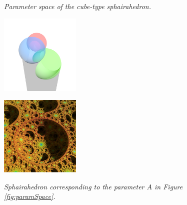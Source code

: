 \begin{figure}[htbp]
\begin{minipage}[t]{0.24\textwidth}
\begin{tikzpicture}[line cap=round,line join=round,>=triangle
 45,x=1cm,y=1cm]
\end{tikzpicture}
  \caption{\textit{Parameter space of the cube-type sphairahedron.}}
  \label{fig:paramSpace}
 \end{minipage}
 \hspace*{\fill}
 \begin{minipage}[t]{0.5\textwidth}
  \begin{minipage}[t]{0.24\textwidth}
   \centering
   \includegraphics[width=1.5in, height=1.5in, keepaspectratio]{./img/application/sphairahedron/derivation/prism-0864.png}
   \label{fig:pointASphaira}
  \end{minipage}
  \hspace*{\fill}
  \begin{minipage}[t]{0.24\textwidth}
   \centering
   \includegraphics[width=1.5in, height=1.5in, keepaspectratio]{./img/application/sphairahedron/derivation/limit-0864.jpg}
   \label{fig:pointALimit}
  \end{minipage}
  \hspace*{\fill}
  \caption{\textit{Sphairahedron corresponding to the parameter $A$ in
  Figure \ref{fig:paramSpace}.}}
  \label{fig:pointA}
 \end{minipage}
\end{figure}

